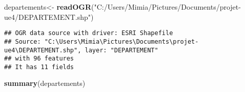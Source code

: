 \documentclass[]{article}
\newenvironment{Shaded}{\begin{snugshade}}{\end{snugshade}}
\newcommand{\KeywordTok}[1]{\textcolor[rgb]{0.13,0.29,0.53}{\textbf{#1}}}
\newcommand{\StringTok}[1]{\textcolor[rgb]{0.31,0.60,0.02}{#1}}
\newcommand{\NormalTok}[1]{#1}
\begin{document}
\begin{Shaded}
\begin{Highlighting}[]
\NormalTok{departements<-}\StringTok{ }\KeywordTok{readOGR}\NormalTok{(}\StringTok{"C:/Users/Mimia/Pictures/Documents/projet-ue4/DEPARTEMENT.shp"}\NormalTok{)}
\end{Highlighting}
\end{Shaded}

\begin{verbatim}
## OGR data source with driver: ESRI Shapefile 
## Source: "C:\Users\Mimia\Pictures\Documents\projet-ue4\DEPARTEMENT.shp", layer: "DEPARTEMENT"
## with 96 features
## It has 11 fields
\end{verbatim}

\begin{Shaded}
\begin{Highlighting}[]
 \KeywordTok{summary}\NormalTok{(departements)}
\end{Highlighting}
\end{Shaded}
\end{document}
